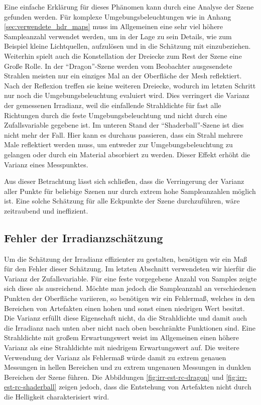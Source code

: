 		Eine einfache Erklärung für dieses Phänomen kann durch eine Analyse der Szene gefunden werden.
		Für komplexe Umgebungsbeleuchtungen wie in Anhang \ref{sec:verwendete_hdr_maps} muss im Allgemeinen eine sehr viel höhere Sampleanzahl verwendet werden, um in der Lage zu sein Details, wie zum Beispiel kleine Lichtquellen, aufzulösen und in die Schätzung mit einzubeziehen.
		Weiterhin spielt auch die Konstellation der Dreiecke zum Rest der Szene eine Große Rolle.
		In der \enquote{Dragon}-Szene werden vom Beobachter ausgesendete Strahlen meisten nur ein einziges Mal an der Oberfläche der Mesh reflektiert.
		Nach der Reflexion treffen sie keine weiteren Dreiecke, wodurch im letzten Schritt nur noch die Umgebungsbeleuchtung evaluiert wird.
		Dies verringert die Varianz der gemessenen Irradianz, weil die einfallende Strahldichte für fast alle Richtungen durch die feste Umgebungsbeleuchtung und nicht durch eine Zufallsvariable gegebene ist.
		Im unteren Stand der \enquote{Shaderball}-Szene ist dies nicht mehr der Fall.
		Hier kann es durchaus passieren, dass ein Strahl mehrere Male reflektiert werden muss, um entweder zur Umgebungsbeleuchtung zu gelangen oder durch ein Material absorbiert zu werden.
		Dieser Effekt erhöht die Varianz eines Messpunktes.

		Aus dieser Betrachtung lässt sich schließen, dass die Verringerung der Varianz aller Punkte für beliebige Szenen nur durch extrem hohe Sampleanzahlen möglich ist.
		Eine solche Schätzung für alle Eckpunkte der Szene durchzuführen, wäre zeitraubend und ineffizient.


	\subsection{Fehler der Irradianzschätzung} %
	\label{sub:fehler_der_irradianzschätzung}

		Um die Schätzung der Irradianz effizienter zu gestalten, benötigen wir ein Maß für den Fehler dieser Schätzung.
		Im letzten Abschnitt verwendeten wir hierfür die Varianz der Zufallsvariable.
		Für eine feste vorgegebene Anzahl von Samples zeigte sich diese als ausreichend.
		Möchte man jedoch die Sampleanzahl an verschiedenen Punkten der Oberfläche variieren, so benötigen wir ein Fehlermaß, welches in den Bereichen von Artefakten einen hohen und sonst einen niedrigen Wert besitzt.
		Die Varianz erfüllt diese Eigenschaft nicht, da die Strahldichte und damit auch die Irradianz nach unten aber nicht nach oben beschränkte Funktionen sind.
		Eine Strahldichte mit großem Erwartungswert weist im Allgemeinen einen höhere Varianz als eine Strahldichte mit niedrigem Erwartungswert auf.
		Die weitere Verwendung der Varianz als Fehlermaß würde damit zu extrem genauen Messungen in hellen Bereichen und zu extrem ungenauen Messungen in dunklen Bereichen der Szene führen.
		Die Abbildungen \ref{fig:irr-est-rc-dragon} und \ref{fig:irr-est-rc-shaderball} zeigen jedoch, dass die Entstehung von Artefakten nicht durch die Helligkeit charakterisiert wird.

